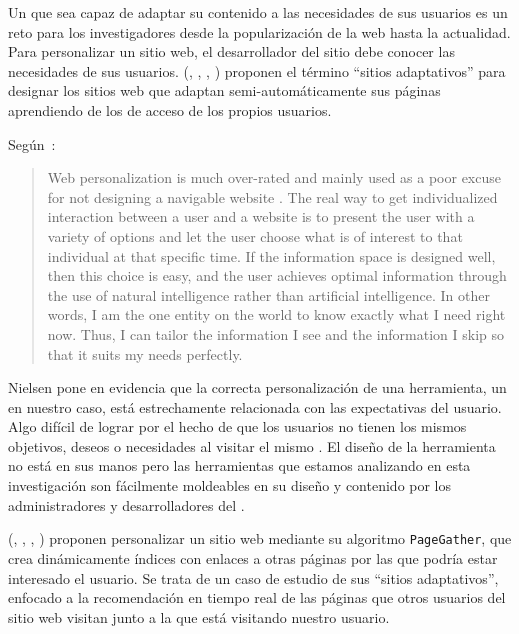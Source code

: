 
Un \portalWeb que sea capaz de adaptar su contenido a las necesidades de sus usuarios es un reto para los investigadores desde la popularización de la web hasta la actualidad. Para personalizar un sitio web, el desarrollador del sitio debe conocer las necesidades de sus usuarios. \citeauthor{PerkowitzEtzioni-AdaptiveSites-1997} (\cite*{PerkowitzEtzioni-AdaptiveSites-1997}, \cite*{PerkowitzEtzioni-AWSAnAIChallenge-1997}, \cite*{PerkowitzEtzioni-AWSAutomaticallySynthesizingWebPages-1998}, \cite*{PerkowitzEtzioni-AdaptiveWebSites-2000}) proponen el término "`sitios adaptativos"' para designar los sitios web que adaptan semi-automáticamente sus páginas aprendiendo de los \patrones de acceso de los propios usuarios.

Según~\citet{Nielsen-PersonalizationIsOverRated-1998}:
\begin{quotation}
  Web personalization is much over-rated and mainly used as a poor excuse for not designing a navigable website . The real way to get individualized interaction between a user and a website is to present the user with a variety of options and let the user choose what is of interest to that individual at that specific time. If the information space is designed well, then this choice is easy, and the user achieves optimal information through the use of natural intelligence rather than artificial intelligence. In other words, I am the one entity on the world to know exactly what I need right now. Thus, I can tailor the information I see and the information I skip so that it suits my needs perfectly.
\end{quotation}

Nielsen pone en evidencia que la correcta personalización de una herramienta, un \portalWeb en nuestro caso, está estrechamente relacionada con las expectativas del usuario. Algo difícil de lograr por el hecho de que los usuarios no tienen los mismos objetivos, deseos o necesidades al visitar el mismo \portalWeb. El diseño de la herramienta no está en sus manos pero las herramientas que estamos analizando en esta investigación son fácilmente moldeables en su diseño y contenido por los administradores y desarrolladores del \portalWeb.

\citeauthor{PerkowitzEtzioni-TowardsAdaptiveWebSites-1999} (\cite*{PerkowitzEtzioni-AWSAutomaticallySynthesizingWebPages-1998}, \cite*{PerkowitzEtzioni-TowardsAdaptiveWebSites-1999}, \cite*{PerkowitzEtzioni-AWSConceptualClusterMining-1999}, \cite*{PerkowitzEtzioni-TowardsAdaptiveWebSites-2000}) proponen personalizar un sitio web mediante su algoritmo \texttt{PageGather}, que crea dinámicamente índices con enlaces a otras páginas por las que podría estar interesado el usuario. Se trata de un caso de estudio de sus "`sitios adaptativos"', enfocado a la recomendación en tiempo real de las páginas que otros usuarios del sitio web visitan junto a la que está visitando nuestro usuario.

